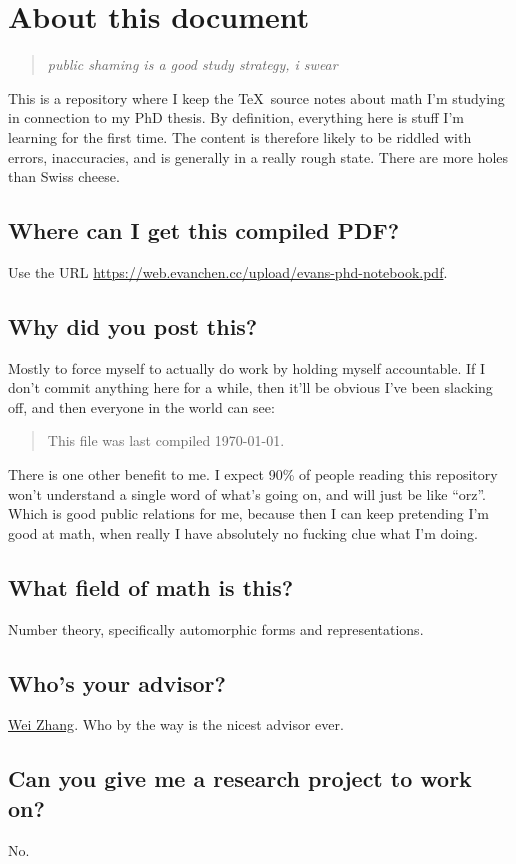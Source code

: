 \chapter*{About this document}
\begin{quote}
\itshape public shaming is a good study strategy, i swear
\end{quote}

This is a repository where I keep the \TeX\ source notes about math I'm studying
in connection to my PhD thesis. By definition, everything here is stuff I'm
learning for the first time. The content is therefore likely to be riddled with
errors, inaccuracies, and is generally in a really rough state. There are more
holes than Swiss cheese.

\section*{Where can I get this compiled PDF?}
Use the URL \url{https://web.evanchen.cc/upload/evans-phd-notebook.pdf}.

\section*{Why did you post this?}
Mostly to force myself to actually do work by holding myself accountable. If I
don't commit anything here for a while, then it'll be obvious I've been slacking
off, and then everyone in the world can see:

\begin{quote}
  This file was last compiled \today.
\end{quote}

There is one other benefit to me. I expect 90\% of people reading this repository
won't understand a single word of what's going on, and will just be like ``orz''.
Which is good public relations for me, because then I can keep pretending I'm
good at math, when really I have absolutely no fucking clue what I'm doing.

\section*{What field of math is this?}
Number theory, specifically automorphic forms and representations.

\section*{Who's your advisor?}
\href{https://en.wikipedia.org/wiki/Wei_Zhang_(mathematician)}{Wei Zhang}.
Who by the way is the nicest advisor ever.

\section*{Can you give me a research project to work on?}
No.

